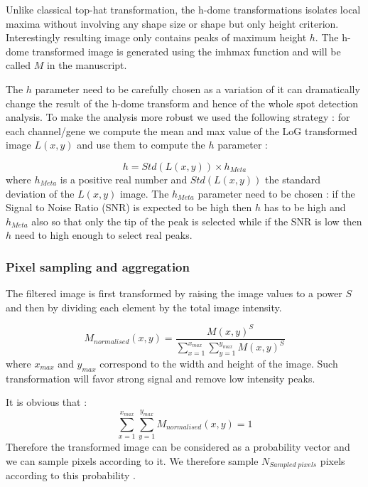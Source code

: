 \documentclass[12pt]{article}
\begin{document}
Unlike classical top-hat transformation, the h-dome transformations isolates local maxima without involving any shape size or shape  but only height criterion. Interestingly resulting image only contains peaks of maximum height $h$.
The h-dome transformed image is generated using the imhmax function and will be called $M$ in the manuscript. 

The $h$ parameter need to be carefully chosen as a variation of it can dramatically change the result of the h-dome transform and hence of the whole spot detection analysis. To make the analysis more robust we used the following strategy : for each channel/gene we compute the mean and max value of the LoG transformed image $L(x,y)$ and use them to compute the $h$ parameter :

\begin{equation}
h = Std(L(x,y)) \times h_{Meta}
\end{equation}
where $h_{Meta}$ is a positive real number and $Std(L(x,y))$  the standard deviation of the $L(x,y)$ image.
The $h_{Meta}$ parameter need to be chosen : if the Signal to Noise Ratio (SNR) is expected to be high then $h$ has to be high and  $h_{Meta}$ also so that only the tip of the peak is selected while if the SNR is low then $h$ need to high enough to select real peaks.

\subsubsection{Pixel sampling and aggregation}

The filtered image is first transformed by raising the image values to a power $S$ and then by dividing each element by the total image intensity.

\begin{equation}
M_{normalised}(x,y)= \frac{M(x,y)^S}{\sum_{x=1}^{x_{max}} \sum_{y=1}^{y_{max}} M(x,y)^S}	
\end{equation}
where $x_{max}$ and $y_{max}$ correspond to the width and height of the image. Such transformation will favor strong signal and remove low intensity peaks. 

It is obvious that :
\begin{equation}
\sum_{x=1}^{x_{max}} \sum_{y=1}^{y_{max}} M_{normalised}(x,y) = 1
\end{equation}
Therefore the transformed image can be considered as a probability vector and we can sample pixels according to it. We therefore sample $N_{Sampled \; pixels}$ pixels according to this probability . 
\end{document}
